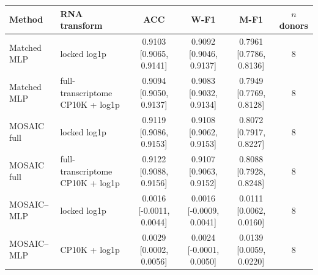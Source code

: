 \begin{tabular}{llcccc}
\toprule
Method & RNA transform & ACC & W-F1 & M-F1 & $n$ donors \\
\midrule
Matched MLP & locked log1p & 0.9103 [0.9065, 0.9141] & 0.9092 [0.9046, 0.9137] & 0.7961 [0.7786, 0.8136] & 8 \\
Matched MLP & full-transcriptome CP10K + log1p & 0.9094 [0.9050, 0.9137] & 0.9083 [0.9032, 0.9134] & 0.7949 [0.7769, 0.8128] & 8 \\
MOSAIC full & locked log1p & 0.9119 [0.9086, 0.9153] & 0.9108 [0.9062, 0.9153] & 0.8072 [0.7917, 0.8227] & 8 \\
MOSAIC full & full-transcriptome CP10K + log1p & 0.9122 [0.9088, 0.9156] & 0.9107 [0.9063, 0.9152] & 0.8088 [0.7928, 0.8248] & 8 \\
MOSAIC--MLP & locked log1p & 0.0016 [-0.0011, 0.0044] & 0.0016 [-0.0009, 0.0041] & 0.0111 [0.0062, 0.0160] & 8 \\
MOSAIC--MLP & CP10K + log1p & 0.0029 [0.0002, 0.0056] & 0.0024 [-0.0001, 0.0050] & 0.0139 [0.0059, 0.0220] & 8 \\
\bottomrule
\end{tabular}
